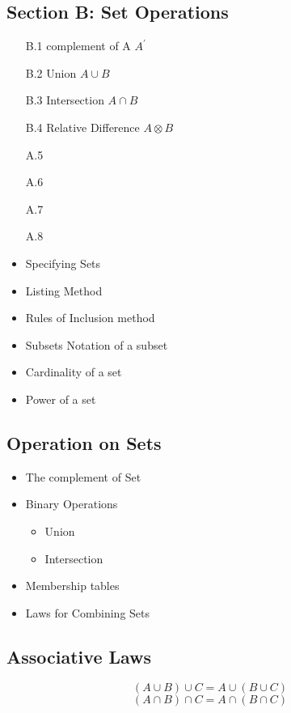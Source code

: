 \documentclass[]{report}
\begin{document}
\begin{enumerate}
\newpage
\section*{Section B: Set Operations}
\begin{itemize}
\item[B.1] complement of A $A^{\prime}$
\item[B.2] Union $A \cup B$
\item[B.3] Intersection $A \cap B$
\item[B.4] Relative Difference $A \otimes B$
\item[A.5]
\item[A.6]
\item[A.7]
\item[A.8]
\end{itemize}
\newpage


\begin{itemize}
\item Specifying Sets
\item Listing Method
\item Rules of Inclusion method
\end{itemize}


\begin{itemize}
\item Subsets Notation of a subset
\item Cardinality of a set
\item Power of a set
\end{itemize}

\subsection*{Operation on Sets}

\begin{itemize}
\item The complement of Set
\item Binary Operations
\begin{itemize}
\item Union
\item Intersection
\end{itemize}
\item Membership tables
\item Laws for Combining Sets
\end{itemize}

\newpage


\subsection*{Associative Laws}
\[ (A \cup B) \cup C =  A \cup (B \cup C)  \]
\[ (A \cap B) \cap C =  A \cap (B \cap C)  \]


\end{enumerate}
\end{document}
